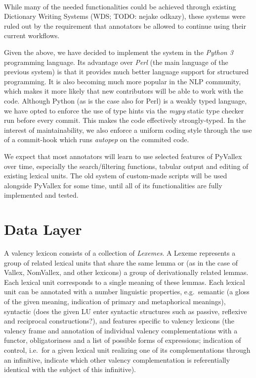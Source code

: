 \documentclass[10pt, a4paper]{article}
\begin{document}
\paragraph{} While many of the needed functionalities could be achieved through existing Dictionary Writing Systems
(WDS; TODO: nejake odkazy), these systems were ruled out by the requirement that annotators be allowed
to continue using their current workflows.

Given the above, we have decided to implement the system in the \emph{Python 3} programming
language. Its advantage over \emph{Perl} (the main language of the previous system) is that it provides
much better language support for structured programming. It is also becoming much more popular in
the NLP community, which makes it more likely that new contributors will be able to work with the
code. Although Python (as is the case also for Perl) is a weakly typed language, we have opted
to enforce the use of type hints via the \emph{mypy} static type checker \cite{tool:mypy} run before every commit.
This makes the code effectively strongly-typed. In the interest of maintainability, we also enforce
a uniform coding style through the use of a commit-hook which runs \emph{autopep} \cite{tool:autopep8}
on the commited code.

We expect that most annotators will learn to use selected features of PyVallex over time, especially the search/filtering functions, tabular output and editing of existing lexical units.
The old system of custom-made scripts will be used alongside PyVallex for some time, until all of its functionalities are fully implemented and tested.


\section{Data Layer}
A valency lexicon consists of a collection of \emph{Lexemes}. A Lexeme represents a group of related
lexical units that share the same lemma or (as in the case of Vallex, NomVallex, and other lexicons) a group of derivationally related lemmas. Each lexical unit corresponds to a single meaning of these lemmas. Each lexical unit can be annotated
with a number linguistic properties,
e.g.\
semantic (a gloss of the given meaning,
indication of primary and metaphorical meanings),
syntactic (does the given LU enter syntactic structures such as passive, reflexive and reciprocal constructions?),
and features specific to valency lexicons
(the valency frame and annotation of individual valency complementations with a functor, obligatoriness and a list of possible forms of expressions;
indication of control, i.e.\ for a given lexical unit realizing one of its complementations through an infinitive,
indicate which other valency complementation is referentially identical with the subject of this infinitive).
\end{document}
